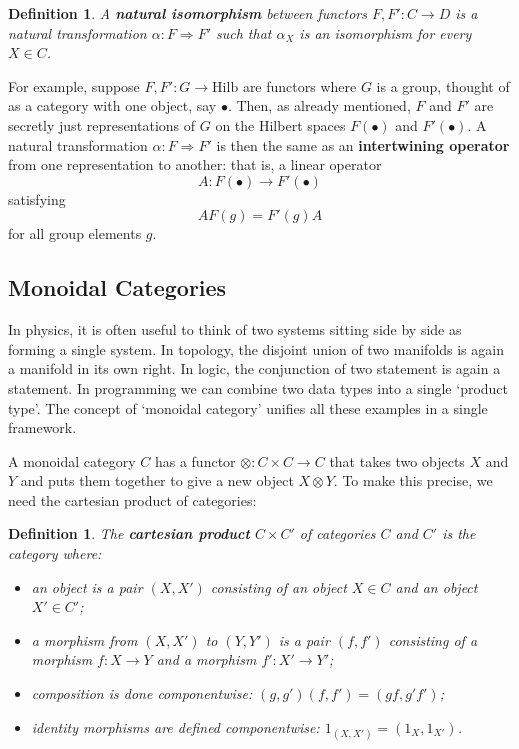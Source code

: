 \documentclass[12pt]{article}
\newtheorem{definition}[thm]{Definition}
\newcommand{\Hilb}{\mathrm{Hilb}}
\newcommand{\maps}{\colon}
\newcommand{\To}{\Rightarrow}
\newcommand{\tensor}{\otimes}
\begin{document}
\begin{definition} A {\bf natural isomorphism} between functors
$F,F' \maps C \to D$ is a natural transformation $\alpha \maps F
\Rightarrow F'$ such that $\alpha_X$ is an isomorphism for every $X \in
C$.
\end{definition}

For example, suppose $F, F' \maps G \to \Hilb$ are functors where
$G$ is a group, thought of as a category with one object, say $\bullet$.
Then, as already mentioned, $F$ and $F'$ are secretly just representations 
of $G$ on the Hilbert spaces $F(\bullet)$ and $F'(\bullet)$.  A natural 
transformation $\alpha \maps F \To F'$ is then the same as an {\bf 
intertwining operator} from one representation to another: that is, a 
linear operator 
\[  A \maps F(\bullet) \to F'(\bullet) \]
satisfying
\[  A F(g) = F'(g) A \]
for all group elements $g$. 

\subsection{Monoidal Categories}
\label{monoidal}

In physics, it is often useful to think of two systems sitting side by
side as forming a single system.  In topology, the disjoint union of
two manifolds is again a manifold in its own right.  In logic, the
conjunction of two statement is again a statement.  In programming we
can combine two data types into a single `product type'.
The concept of `monoidal category' unifies all these examples in a
single framework.

A monoidal category $C$ has a functor $\tensor \maps C \times C \to C$
that takes two objects $X$ and $Y$ and puts them together to give a new
object $X \tensor Y$.  To make this precise, we need the cartesian
product of categories:

\begin{definition} The {\bf cartesian product} $C \times C'$ of
categories $C$ and $C'$ is the category where:
\begin{itemize}
\item an object is 
a pair $(X,X')$ consisting of an object $X \in C$ and an object 
$X' \in C'$;
\item a morphism from $(X,X')$ to $(Y,Y')$ is a pair $(f,f')$ consisting
of a morphism $f \maps X \to Y$ and a morphism $f' \maps X' \to Y'$;
\item composition is done componentwise: $(g,g')(f,f') = (gf,g'f')$;
\item identity morphisms are defined componentwise:
$1_{(X,X')} = (1_X, 1_{X'})$.
\end{itemize}
\end{definition}
\end{document}

